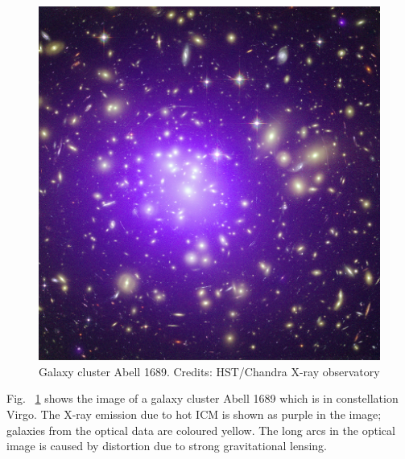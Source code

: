\begin{figure}[ht]
\includegraphics[width = \columnwidth]{figs/Abell_1689.jpg}
\caption{Galaxy cluster Abell 1689. Credits: HST/Chandra X-ray observatory}
\label{cluster}
\end{figure}

Fig. ~\ref{cluster} shows the image of a galaxy cluster Abell 1689 which is in constellation Virgo. The X-ray emission due to hot ICM is shown as purple in the image; galaxies from the optical data are coloured yellow. The long arcs in the optical image is caused by distortion due to strong gravitational lensing. \\

